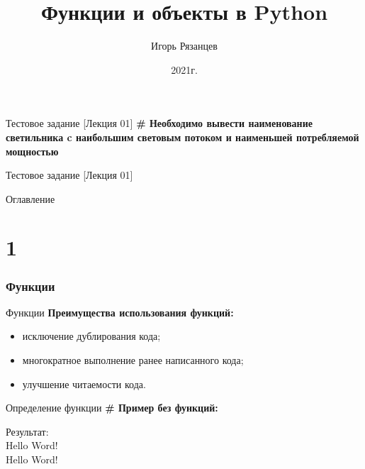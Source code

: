 \documentclass[12pt]{beamer}
\author{Игорь Рязанцев}
\title{Функции и объекты в Python}
\institute{Лекция 02}
\date{2021г.}
\begin{document}
\begin{frame}
\titlepage
\end{frame}

\begin{frame}{Тестовое задание [Лекция 01]}
\textbf{\# Необходимо вывести наименование светильника c наибольшим световым потоком и наименьшей потребляемой мощностью} 
\vspace{0.5cm}

\vspace{0.5cm}
\end{frame}

\begin{frame}{Тестовое задание [Лекция 01]}

\vspace{0.5cm}
\end{frame}

\begin{frame}[t]{Оглавление}
\tableofcontents[part=1]
\end{frame}



\part{1}
\section{Функции}
\begin{frame}{Функции}
\textbf{Преимущества использования функций:}
\begin{itemize}
\item исключение дублирования кода;
\item многократное выполнение ранее написанного кода;
\item улучшение читаемости кода.
\end{itemize}
\end{frame}

\begin{frame}{Определение функции}
\textbf{\# Пример без функций:} \\
\vspace{0.5cm}

\vspace{0.5cm}
Результат: \\
Hello Word! \\
Hello Word! \\
\end{frame}
\end{document}
